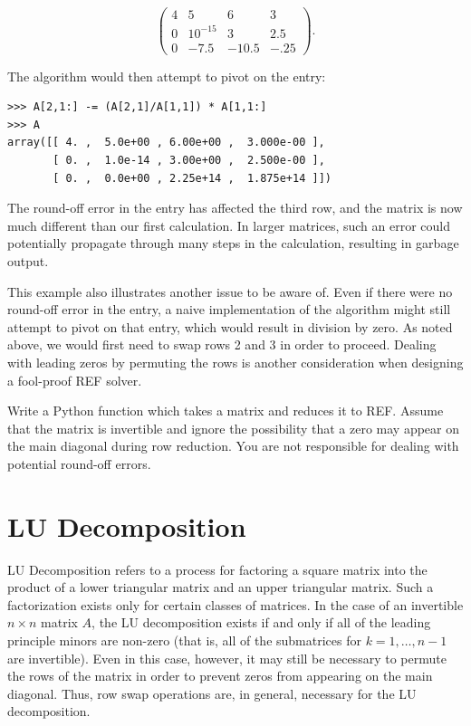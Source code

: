 \[
\begin{pmatrix}
4&5&6&3 \\
0&10^{-15}&3&2.5 \\
0&-7.5&-10.5&-.25
\end{pmatrix}.
\]

The algorithm would then attempt to pivot on the  entry:

\begin{lstlisting}
>>> A[2,1:] -= (A[2,1]/A[1,1]) * A[1,1:]
>>> A
array([[ 4. ,  5.0e+00 , 6.00e+00 ,  3.000e-00 ],
       [ 0. ,  1.0e-14 , 3.00e+00 ,  2.500e-00 ],
       [ 0. ,  0.0e+00 , 2.25e+14 ,  1.875e+14 ]])
\end{lstlisting}

The round-off error in the  entry has affected the third
row, and the matrix is now much different than our first calculation. In larger matrices, such an error could potentially propagate through many steps in the calculation, resulting in garbage output.

This example also illustrates another issue to be aware of. Even if there were no round-off error in the  entry, a naive implementation of the algorithm might still attempt to pivot on that entry, which would result in division by zero. As noted above, we would first need to swap rows 2 and 3 in order to proceed. Dealing with leading zeros by permuting the rows is another consideration when designing a fool-proof REF solver.

\begin{problem}
\label{prob:REF}
Write a Python function which takes a matrix and reduces it to REF.
Assume that the matrix is invertible and ignore the possibility that a zero may appear on the main diagonal during row reduction. You are not
responsible for dealing with potential round-off errors.
\end{problem}

\section*{LU Decomposition}
LU Decomposition refers to a process for factoring a square matrix into the product of a lower triangular matrix and an upper triangular matrix. Such a factorization exists only for certain classes of matrices. In the case of an invertible $n \times n$ matrix $A$, the LU decomposition exists if and only if all of the leading principle minors are non-zero (that is, all of the submatrices  for $k = 1,\ldots,n-1$ are invertible). Even in this case, however, it may still be necessary to permute the rows of the matrix in order to prevent zeros from appearing on the main diagonal. Thus, row swap operations are, in general, necessary for the LU decomposition.

